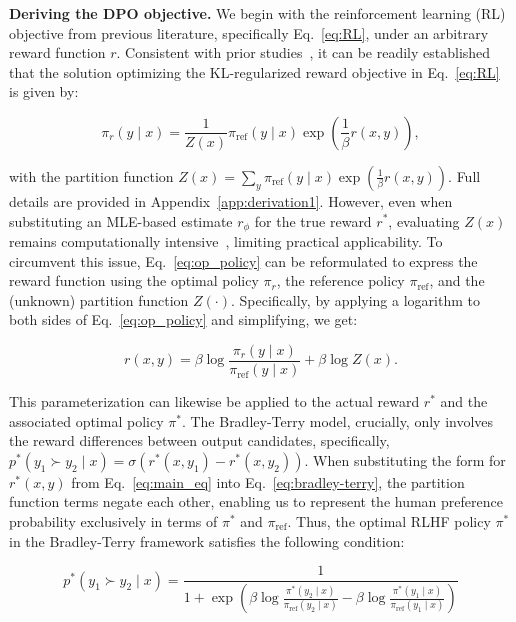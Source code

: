 \textbf{Deriving the DPO objective.} We begin with the reinforcement learning (RL) objective from previous literature, specifically Eq.~\ref{eq:RL}, under an arbitrary reward function $r$. Consistent with prior studies~\citep{peters2007reinforcement, peng2019advantage, korbak2022reinforcement, go2023aligning}, it can be readily established that the solution optimizing the KL-regularized reward objective in Eq.~\ref{eq:RL} is given by:

\begin{equation}\label{eq:op_policy}
    \pi_r(y\mid x) = \frac{1}{Z(x)}\pi_\text{ref}(y\mid x)\exp\left(\frac{1}{\beta}r(x, y)\right),
\end{equation}

with the partition function $Z(x) =\sum_{y}\pi_\text{ref}(y\mid x)\exp\left(\frac{1}{\beta}r(x, y)\right)$. Full details are provided in Appendix~\ref{app:derivation1}. However, even when substituting an MLE-based estimate $r_{\phi}$ for the true reward $r^*$, evaluating $Z(x)$ remains computationally intensive~\citep{korbak2022reinforcement, go2023aligning}, limiting practical applicability. To circumvent this issue, Eq.~\ref{eq:op_policy} can be reformulated to express the reward function using the optimal policy $\pi_r$, the reference policy $\pi_\text{ref}$, and the (unknown) partition function $Z(\cdot)$. Specifically, by applying a logarithm to both sides of Eq.~\ref{eq:op_policy} and simplifying, we get:

\begin{equation}\label{eq:main_eq}
    r(x,y) =\beta \log \frac{\pi_r(y\mid x)}{\pi_\text{ref}(y\mid x)} + \beta \log Z(x).
\end{equation}

This parameterization can likewise be applied to the actual reward $r^*$ and the associated optimal policy $\pi^*$. The Bradley-Terry model, crucially, only involves the reward differences between output candidates, specifically, ${p^*(y_1 \succ y_2 \mid x) = \sigma(r^*(x, y_1) - r^*(x, y_2))}$. When substituting the form for $r^*(x,y)$ from Eq.~\ref{eq:main_eq} into Eq.~\ref{eq:bradley-terry}, the partition function terms negate each other, enabling us to represent the human preference probability exclusively in terms of $\pi^*$ and $\pi_\text{ref}$. Thus, the optimal RLHF policy $\pi^*$ in the Bradley-Terry framework satisfies the following condition:

\begin{equation}\label{eq:objective}
    p^*(y_1\succ y_2 \mid x)=\frac{1}{1 + \exp\left(\beta \log \frac{\pi^*(y_2\mid x)}{\pi_\text{ref}(y_2\mid x)} - \beta \log \frac{\pi^*(y_1\mid x)}{\pi_\text{ref}(y_1\mid x)}\right)}
\end{equation}

